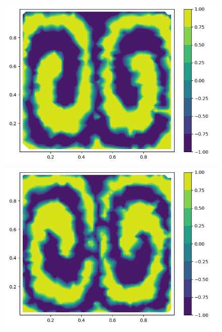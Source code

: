 \documentclass[a4paper, 14pt]{extarticle}
\begin{document}
		\begin{figure}[H]
			\begin{minipage}{0.5\textwidth}
				\centering
				\includegraphics[width = \linewidth]{7.jpg}
			\end{minipage}\hfill
			\begin{minipage}{0.5\textwidth}
				\centering
				\includegraphics[width = \linewidth]{8.jpg}
			\end{minipage}\hfill
		\end{figure}
	
\end{document}
